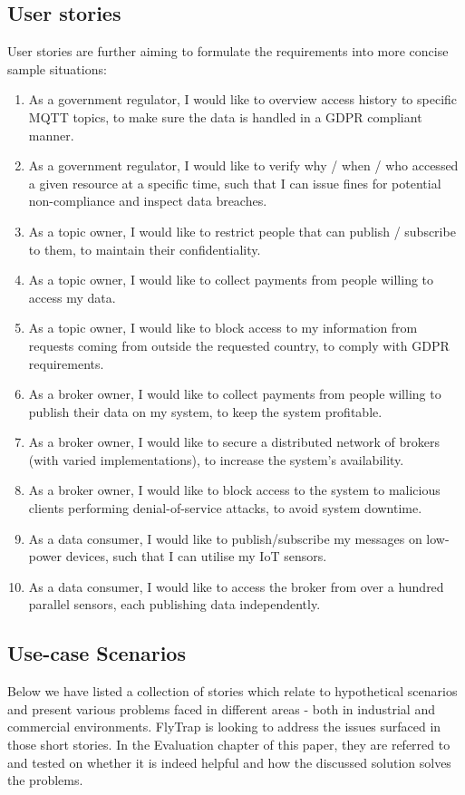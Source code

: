 \subsection{User stories}
User stories are further aiming to formulate the requirements into more concise sample situations:
\begin{enumerate}
\item As a government regulator, I would like to overview access history to specific MQTT topics, to make sure the data is handled in a GDPR compliant manner.
\item As a government regulator, I would like to verify why / when / who accessed a given resource at a specific time, such that I can issue fines for potential non-compliance and inspect data breaches.
\item As a topic owner, I would like to restrict people that can publish / subscribe to them, to maintain their confidentiality.
\item As a topic owner, I would like to collect payments from people willing to access my data.
\item As a topic owner, I would like to block access to my information from requests coming from outside the requested country, to comply with GDPR requirements.
\item As a broker owner, I would like to collect payments from people willing to publish their data on my system, to keep the system profitable.
\item As a broker owner, I would like to secure a distributed network of brokers (with varied implementations), to increase the system's availability. 
\item As a broker owner, I would like to block access to the system to malicious clients performing denial-of-service attacks, to avoid system downtime.
\item As a data consumer, I would like to publish/subscribe my messages on low-power devices, such that I can utilise my IoT sensors.
\item As a data consumer, I would like to access the broker from over a hundred parallel sensors, each publishing data independently.
\end{enumerate}

\subsection{Use-case Scenarios}\label{sec:usecase}
Below we have listed a collection of stories which relate to hypothetical scenarios and present various problems faced in different areas - both in industrial and commercial environments. FlyTrap is looking to address the issues surfaced in those short stories. In the Evaluation chapter of this paper, they are referred to and tested on whether it is indeed helpful and how the discussed solution solves the problems.
\\
